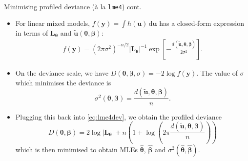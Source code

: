 \documentclass[]{beamer}\usepackage[]{graphicx}\usepackage[]{color}
\begin{document}
\begin{frame}{Minimising profiled deviance (à la \texttt{lme4}) cont.}
	\begin{itemize}
		\item For linear mixed models, $f(\mathbf y) = \int h(\mathbf u) \,\text{d}\mathbf u$ has a closed-form expression in terms of $\mathbf L_{\boldsymbol{\theta}}$ and $\tilde{\mathbf u}(\boldsymbol\theta, \boldsymbol\beta)$:
			\begin{align}\label{eq:lme4dev}
				f(\mathbf y) = (2\pi\sigma^2)^{-n/2} \vert \mathbf L_{\boldsymbol{\theta}} \vert^{-1} \exp \left[- \frac{d ( \tilde{\mathbf u}, \boldsymbol\theta, \boldsymbol\beta)}{2\sigma^2} \right].
			\end{align}
		\item On the deviance scale, we have $D(\boldsymbol\theta, \boldsymbol\beta, \sigma) = -2 \log f(\mathbf y)$. The value of $\sigma$ which minimises the deviance is
			\[
				\sigma^2(\boldsymbol\theta, \boldsymbol\beta) = \frac{d ( \tilde{\mathbf u}, \boldsymbol\theta, \boldsymbol\beta)}{n}.
			\]
		\item Plugging this back into \eqref{eq:lme4dev}, we obtain the profiled deviance
			\[
				D(\boldsymbol\theta, \boldsymbol\beta) = 2 \log \vert \mathbf L_{\boldsymbol{\theta}} \vert + n \left( 1 + \log \left(2\pi \frac{d ( \tilde{\mathbf u}, \boldsymbol\theta, \boldsymbol\beta)}{n} \right)\right)
			\]
			which is then minimised to obtain MLEs $\hat{\boldsymbol\theta}$, $\hat{\boldsymbol\beta}$ and $\sigma^2(\hat{\boldsymbol\theta}, \hat{\boldsymbol\beta})$.
	\end{itemize}
\end{frame}
\end{document}

